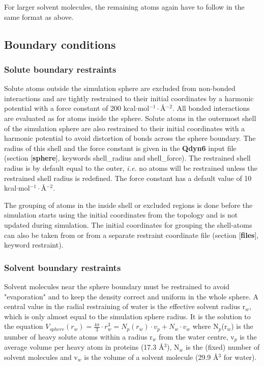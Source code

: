 \documentclass[a4paper,11pt]{article}
\begin{document}
For larger solvent molecules, the remaining atoms again have to 
follow in the same format as above.


\subsection{Boundary conditions}
\label{subsec:boundary}
\subsubsection{Solute boundary restraints}
\label{subsubsec:soluteboundary} Solute atoms outside the
simulation sphere are excluded from non-bonded interactions and
are tightly restrained to their initial coordinates by a harmonic
potential with a force constant of 200
kcal$\cdot$mol$^{-1}\cdot${\AA}$^{-2}$. All bonded interactions are
evaluated as for atoms inside the sphere. Solute atoms in the
outermost shell of the simulation sphere are also restrained to
their initial coordinates with a harmonic potential to avoid
distortion of bonds across the sphere boundary. The radius
of this shell and the force constant is given in the \textbf{Qdyn6} input
file (section [\textbf{sphere}], keywords shell\_radius and
shell\_force). The restrained shell radius is by default equal to the outer,
\emph{i.e.} no atoms will be restrained unless the restrained shell radius is redefined. The force constant has
a default value of 10 kcal$\cdot$mol$^{-1}\cdot${\AA}$^{-2}$.

The grouping of atoms in the inside shell or excluded regions is
done before the simulation starts using the initial coordinates
from the topology and is not updated during simulation. The
initial coordinates for grouping the shell-atoms can also be taken
from or from a separate restraint coordinate file (section
[\textbf{files}], keyword restraint).

\subsubsection{Solvent boundary restraints}
\label{subsubsec:solventboundary}


Solvent molecules near the sphere boundary must be restrained to
avoid "evaporation" and to keep the density correct and uniform in
the whole sphere. A central value in the radial restraining of
water is the effective solvent radius r$_w$, which is only almost
equal to the simulation sphere radius. It is the solution to the
equation $V_{sphere} \left(r_w\right) = \frac{4\pi}{3}\cdot r_w^3
= N_p\left(r_w\right)\cdot v_p+N_w\cdot v_w $ where N$_p$(r$_w$)
is the number of heavy solute atoms within a radius r$_w$ from the
water centre, v$_p$ is the average volume per heavy atom in
proteins (17.3 {\AA}$^3$), N$_w$ is the (fixed) number of solvent
molecules and v$_w$ is the volume of a solvent molecule (29.9
{\AA}$^3$ for water).
\end{document}
